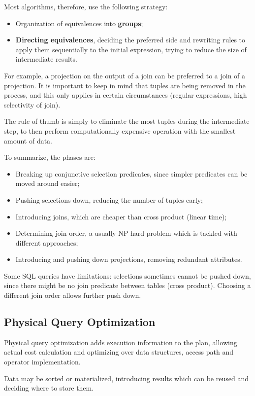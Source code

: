 Most algorithms, therefore, use the following strategy:
\begin{itemize}
	\item Organization of equivalences into \textbf{groups};
	\item \textbf{Directing equivalences}, deciding the preferred side and rewriting rules to apply them sequentially to the initial expression, trying to reduce the size of intermediate results.
\end{itemize}
For example, a projection on the output of a join can be preferred to a join of a projection. It is important to keep in mind that tuples are being removed in the process, and this only applies in certain circumstances (regular expressions, high selectivity of join).

The rule of thumb is simply to eliminate the most tuples during the intermediate step, to then perform computationally expensive operation with the smallest amount of data.

To summarize, the phases are:
\begin{itemize}
	\item Breaking up conjunctive selection predicates, since simpler predicates can be moved around easier;
	\item Pushing selections down, reducing the number of tuples early;
	\item Introducing joins, which are cheaper than cross product (linear time);
	\item Determining join order, a usually NP-hard problem which is tackled with different approaches;
	\item Introducing and pushing down projections, removing redundant attributes.
\end{itemize}
Some SQL queries have limitations: selections sometimes cannot be pushed down, since there might be no join predicate between tables (cross product). Choosing a different join order allows further push down. 

\subsection{Physical Query Optimization}
Physical query optimization adds execution information to the plan, allowing actual cost calculation and optimizing over data structures, access path and operator implementation.

Data may be sorted or materialized, introducing results which can be reused and deciding where to store them.

